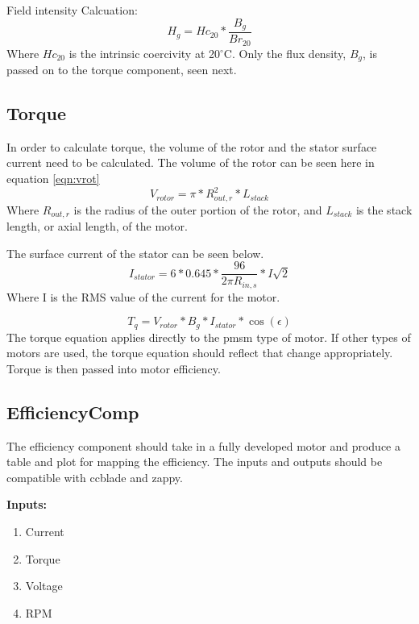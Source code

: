 \documentclass[10pt]{article}
\begin{document}
Field intensity Calcuation:
\begin{equation}
    H_{g} = Hc_{20} * \frac{B_g}{Br_{20}}
\end{equation}
Where $Hc_{20}$ is the intrinsic coercivity at 20$^\circ$C. Only the flux density, $B_{g}$, is passed on to the torque component, seen next.

\subsection{Torque}

In order to calculate torque, the volume of the rotor and the stator surface current need to be calculated. The volume of the rotor can be seen here in equation \ref{eqn:vrot}
\begin{equation}
    V_{rotor} = \pi * R_{out,r}^2 *L_{stack}
    \label{eqn:vrot}
\end{equation}
Where $R_{out,r}$ is the radius of the outer portion of the rotor, and $L_{stack}$ is the stack length, or axial length, of the motor.

The surface current of the stator can be seen below.
\begin{equation}
    I_{stator} = 6 * 0.645* \frac{96}{2\pi R_{in,s}} * I \sqrt{2}
    \label{eqn:istator}
\end{equation}
Where I is the RMS value of the current for the motor.

\begin{equation}
    T_q = V_{rotor} * B_g * I_{stator} * \cos{(\epsilon)}
    \label{eqn:tq}
\end{equation}
The torque equation applies directly to the pmsm type of motor. If other types of motors are used, the torque equation should reflect that change appropriately. Torque is then passed into motor efficiency. 

\subsection{EfficiencyComp}
The efficiency component should take in a fully developed motor and produce a table and plot for mapping the efficiency. The inputs and outputs should be compatible with ccblade and zappy.


\textbf{Inputs:}
\begin{enumerate}
    \item Current
    \item Torque
    \item Voltage
    \item RPM
\end{enumerate}
\end{document}
